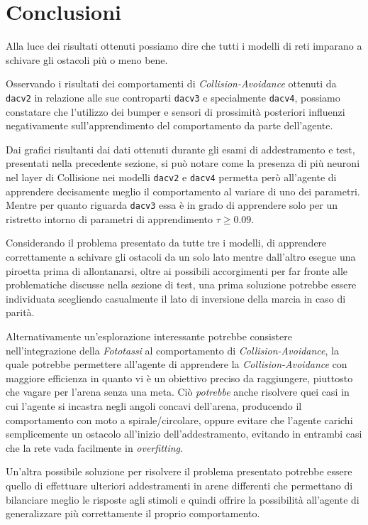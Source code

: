 \section{Conclusioni}

Alla luce dei risultati ottenuti possiamo dire che tutti i modelli di reti imparano a schivare gli ostacoli più o meno bene. 

Osservando i risultati dei comportamenti di \textit{Collision-Avoidance} ottenuti da \texttt{dacv2} in relazione alle sue controparti \texttt{dacv3} e specialmente \texttt{dacv4}, possiamo constatare che l'utilizzo dei bumper e sensori di prossimità posteriori influenzi negativamente sull'apprendimento del comportamento da parte dell'agente. 

Dai grafici risultanti dai dati ottenuti durante gli esami di addestramento e test, presentati nella precedente sezione, si può notare come la presenza di più neuroni nel layer di Collisione nei modelli \texttt{dacv2} e \texttt{dacv4} permetta però all'agente di apprendere decisamente meglio il comportamento al variare di uno dei parametri. Mentre per quanto riguarda \texttt{dacv3} essa è in grado di apprendere solo per un ristretto intorno di parametri di apprendimento $\tau \ge 0.09$.

Considerando il problema presentato da tutte tre i modelli, di apprendere correttamente a schivare gli ostacoli da un solo lato mentre dall'altro esegue una piroetta prima di allontanarsi, oltre ai possibili accorgimenti per far fronte alle problematiche discusse nella sezione di test, una prima soluzione potrebbe essere individuata scegliendo casualmente il lato di inversione della marcia in caso di parità. 

Alternativamente un'esplorazione interessante potrebbe consistere nell'integrazione della \textit{Fototassi} al comportamento di \textit{Collision-Avoidance}, la quale potrebbe permettere all'agente di apprendere la \textit{Collision-Avoidance} con maggiore efficienza in quanto vi è un obiettivo preciso da raggiungere, piuttosto che vagare per l'arena senza una meta. Ciò \textit{potrebbe} anche risolvere quei casi in cui l'agente si incastra negli angoli concavi dell'arena, producendo il comportamento con moto a spirale/circolare, oppure evitare che l'agente carichi semplicemente un ostacolo all'inizio dell'addestramento, evitando in entrambi casi che la rete vada facilmente in \textit{overfitting}.

Un'altra possibile soluzione per risolvere il problema presentato potrebbe essere quello di effettuare ulteriori addestramenti in arene differenti che permettano di bilanciare meglio le risposte agli stimoli e quindi offrire la possibilità all'agente di generalizzare più correttamente il proprio comportamento.

